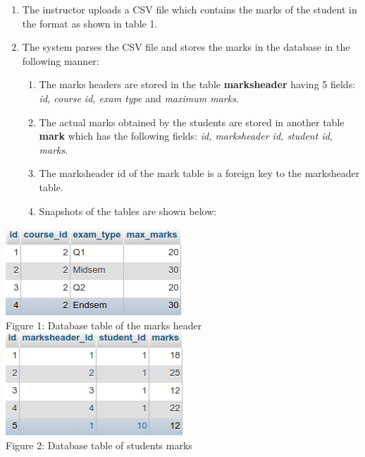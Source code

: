 \begin{enumerate}
	\item The instructor uploads a CSV file which contains the marks of the student in the format as shown in table 1.
	\item The system parses the CSV file and stores the marks in the database in the following manner:
	\begin{enumerate}
		\item The marks headers are stored in the table \textbf{marksheader} having 5 fields: \textit{id, course id, exam type} and \textit{maximum marks}.
		\item The actual marks obtained by the students are stored in another table \textbf{mark} which has the following fields: \textit{id, marksheader id, student id, marks}.
		\item The marksheader id of the mark table is a foreign key to the marksheader table.
		\item Snapshots of the tables are shown below:
	\end{enumerate}
\end{enumerate}
\newpage		
	\begin{center}
	\includegraphics[scale=0.6]{media/MarksHeader.png} \\
	\vspace{0.1in}
	Figure 1: Database table of the marks header \\
	\vspace{0.2in}
	\includegraphics[scale=0.6]{media/mark.png} \\
	\vspace{0.1in}
	Figure 2: Database table of students marks \\
	\end{center}

